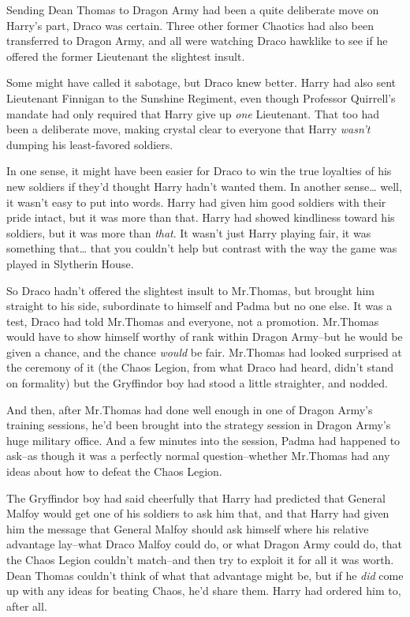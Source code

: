 Sending Dean Thomas to Dragon Army had been a quite deliberate move on Harry's part, Draco was certain. Three other former Chaotics had also been transferred to Dragon Army, and all were watching Draco hawklike to see if he offered the former Lieutenant the slightest insult.

Some might have called it sabotage, but Draco knew better. Harry had also sent Lieutenant Finnigan to the Sunshine Regiment, even though Professor Quirrell's mandate had only required that Harry give up \emph{one} Lieutenant. That too had been a deliberate move, making crystal clear to everyone that Harry \emph{wasn't} dumping his least-favored soldiers.

In one sense, it might have been easier for Draco to win the true loyalties of his new soldiers if they'd thought Harry hadn't wanted them. In another sense{\ldots} well, it wasn't easy to put into words. Harry had given him good soldiers with their pride intact, but it was more than that. Harry had showed kindliness toward his soldiers, but it was more than \emph{that}. It wasn't just Harry playing fair, it was something that{\ldots} that you couldn't help but contrast with the way the game was played in Slytherin House.

So Draco hadn't offered the slightest insult to Mr.\?Thomas, but brought him straight to his side, subordinate to himself and Padma but no one else. It was a test, Draco had told Mr.\?Thomas and everyone, not a promotion. Mr.\?Thomas would have to show himself worthy of rank within Dragon Army\---but he would be given a chance, and the chance \emph{would} be fair. Mr.\?Thomas had looked surprised at the ceremony of it (the Chaos Legion, from what Draco had heard, didn't stand on formality) but the Gryffindor boy had stood a little straighter, and nodded.

And then, after Mr.\?Thomas had done well enough in one of Dragon Army's training sessions, he'd been brought into the strategy session in Dragon Army's huge military office. And a few minutes into the session, Padma had happened to ask\---as though it was a perfectly normal question\---whether Mr.\?Thomas had any ideas about how to defeat the Chaos Legion.

The Gryffindor boy had said cheerfully that Harry had predicted that General Malfoy would get one of his soldiers to ask him that, and that Harry had given him the message that General Malfoy should ask himself where his relative advantage lay\---what Draco Malfoy could do, or what Dragon Army could do, that the Chaos Legion couldn't match\---and then try to exploit it for all it was worth. Dean Thomas couldn't think of what that advantage might be, but if he \emph{did} come up with any ideas for beating Chaos, he'd share them. Harry had ordered him to, after all.

